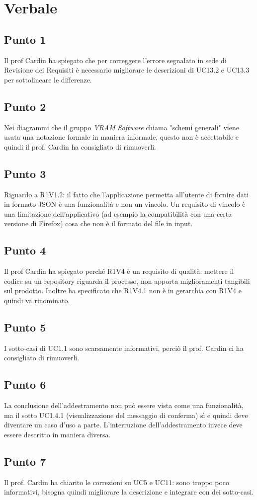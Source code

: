 \section{Verbale}
	\subsection{Punto 1}
	Il prof Cardin ha spiegato che per correggere l'errore segnalato in sede di Revisione dei Requisiti è necessario migliorare le descrizioni di UC13.2 e UC13.3 per sottolineare le differenze.
	
    \subsection{Punto 2}
    Nei diagrammi che il gruppo \textit{VRAM Software} chiama "schemi generali" viene usata una notazione formale in maniera informale, questo non è accettabile e quindi il prof. Cardin ha consigliato di rimuoverli.
    
    \subsection{Punto 3}
    Riguardo a R1V1.2: il fatto che l'applicazione permetta all'utente di fornire dati in formato JSON è una funzionalità e non un vincolo. Un requisito di vincolo è una limitazione dell'applicativo (ad esempio la compatibilità con una certa versione di Firefox) cosa che non è il formato del file in input.
    
    \subsection{Punto 4}
    Il prof Cardin ha spiegato perché R1V4 è un requisito di qualità: mettere il codice su un repository riguarda il processo, non apporta miglioramenti tangibili sul prodotto. Inoltre ha specificato che R1V4.1 non è in gerarchia con R1V4 e quindi va rinominato.
    
    \subsection{Punto 5}
    I sotto-casi di UC1.1 sono scarsamente informativi, perciò il prof. Cardin ci ha consigliato di rimuoverli.
    
    \subsection{Punto 6}
    La conclusione dell'addestramento non può essere vista come una funzionalità, ma il sotto UC1.4.1 (visualizzazione del messaggio di conferma) sì e quindi deve diventare un caso d'uso a parte. L'interruzione dell'addestramento invece deve essere descritto in maniera diversa.
    
    \subsection{Punto 7}
    Il prof. Cardin ha chiarito le correzioni su UC5 e UC11: sono troppo poco informativi, bisogna quindi migliorare la descrizione e integrare con dei sotto-casi.
    
    
    
    
  
       